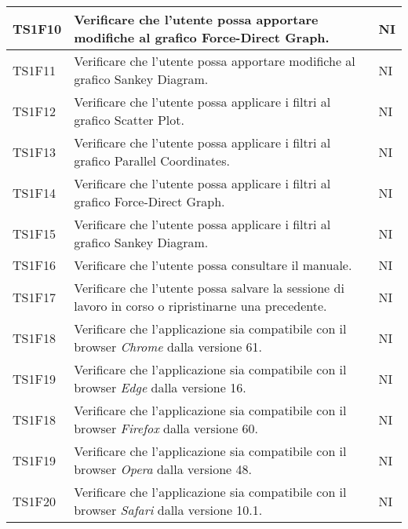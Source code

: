 \begin{center}
\begin{longtable}{|p{1.5cm}|p{11cm}|p{1cm}|}
                \rowcolor[HTML]{C0C0C0}
                TS1F10 & Verificare che l’utente possa apportare modifiche al grafico Force-Direct Graph. & NI\\ \hline
                \rowcolor[HTML]{EFEFEF}
                TS1F11 & Verificare che l’utente possa apportare modifiche al grafico Sankey Diagram. & NI\\ \hline
                \rowcolor[HTML]{C0C0C0}
                TS1F12 & Verificare che l’utente possa applicare i filtri al grafico Scatter Plot. & NI\\ \hline
                \rowcolor[HTML]{EFEFEF}
                TS1F13 & Verificare che l’utente possa applicare i filtri al grafico Parallel Coordinates. & NI\\ \hline
                \rowcolor[HTML]{C0C0C0}
                TS1F14 & Verificare che l’utente possa applicare i filtri al grafico Force-Direct Graph. & NI\\ \hline
                \rowcolor[HTML]{EFEFEF}
                TS1F15 & Verificare che l’utente possa applicare i filtri al grafico Sankey Diagram. & NI\\ \hline
                \rowcolor[HTML]{C0C0C0}
                TS1F16 & Verificare che l’utente possa consultare il manuale. & NI\\ \hline
                \rowcolor[HTML]{EFEFEF}
                TS1F17 & Verificare che l’utente possa salvare la sessione di lavoro in corso o ripristinarne una precedente. & NI\\ \hline
                \rowcolor[HTML]{C0C0C0}
                TS1F18 & Verificare che l'applicazione sia compatibile con il browser \textit{Chrome} dalla versione 61. & NI\\ \hline
                \rowcolor[HTML]{EFEFEF}
                TS1F19 & Verificare che l'applicazione sia compatibile con il browser \textit{Edge} dalla versione 16. & NI\\ \hline
                \rowcolor[HTML]{C0C0C0}
                TS1F18 & Verificare che l'applicazione sia compatibile con il browser \textit{Firefox} dalla versione 60. & NI\\ \hline
                \rowcolor[HTML]{EFEFEF}
                TS1F19 & Verificare che l'applicazione sia compatibile con il browser \textit{Opera} dalla versione 48. & NI\\ \hline
                \rowcolor[HTML]{C0C0C0}
                TS1F20 & Verificare che l'applicazione sia compatibile con il browser \textit{Safari} dalla versione 10.1. & NI\\ \hline
            \end{longtable}
        \end{center}


